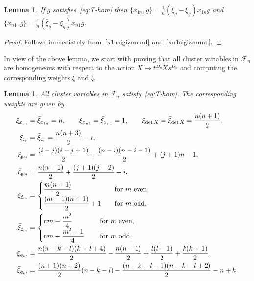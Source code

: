 \documentclass{amsart}
\newtheorem{lemma}[theorem]{Lemma}
\theoremstyle{definition}
\theoremstyle{remark}
\numberwithin{equation}{section}
\numberwithin{theorem}{section}
\def\FF{{\mathcal F}}
\def\ec{{\tt c}}
\def\ef{{\tt f}}
\def\eg{{\tt g}}
\begin{document}
\begin{lemma}\label{x1nbra}
 If $g$ satisfies~\eqref{eq:T-hom} then $\{x_{1n},g\}=\frac1n(\bar\xi_g-\xi_g)x_{1n}g$ and 
$\{x_{n1},g\}=\frac1n(\bar\xi_g-\xi_g)x_{n1}g$.
\end{lemma}

\begin{proof}
Follows immediately from~\eqref{x1nsigizmund} and~\eqref{xn1sigizmund}. 
\end{proof}

 In view of the above lemma, we start with proving that all cluster variables in $\FF_n$ are homogeneous with respect to the action 
$X\mapsto t^{D_n}Xs^{\bar D_n}$ and computing the corresponding weights $\xi$ and
$\bar\xi$.

\begin{lemma}\label{weights}
All cluster variables in $\FF_n$ satisfy~\eqref{eq:T-hom}. 
The corresponding weights are given by
\begin{equation}\label{explweights}
\begin{aligned}
\xi_{x_{1n}}&=\bar\xi_{x_{1n}}=n,\qquad\xi_{x_{n1}}=\bar\xi_{x_{n1}}=1,\qquad 
\xi_{\det X}=\bar\xi_{\det X}=\frac{n(n+1)}2,\\
\xi_{\ec_r}&=\bar\xi_{\ec_r}=\frac{n(n+3)}2-r,\\
\xi_{\eg_{ij}}&=\frac{(i-j)(i-j+1)}2+\frac{(n-i)(n-i-1)}2+(j+1)n-1,\\
\bar\xi_{\eg_{ij}}&=\frac{n(n+1)}2+\frac{(j+1)(j-2)}2+i,\\
\xi_{\ef_m}&=\begin{cases} \dfrac{m(n+1)}2\qquad\quad&\text{for $m$ even},\\
                               \dfrac{(m-1)(n+1)}2+1\quad&\text{for $m$ odd},\end{cases}\\
\bar\xi_{\ef_m}&=\begin{cases} nm-\dfrac{m^2}4\qquad\quad&\text{for $m$ even},\\
                               nm-\dfrac{m^2-1}4\quad&\text{for $m$ odd},\end{cases}\\	
\xi_{\phi_{kl}}&=\frac{n(n-k-l)(k+l+4)}2-\frac{n(n-1)}2+\frac{l(l-1)}2+\frac{k(k+1)}2,\\
\bar\xi_{\phi_{kl}}&=\frac{(n+1)(n+2)}2(n-k-l)-\frac{(n-k-l-1)(n-k-l+2)}2-n+k.												
\end{aligned}
\end{equation}
\end{lemma}
\end{document}
